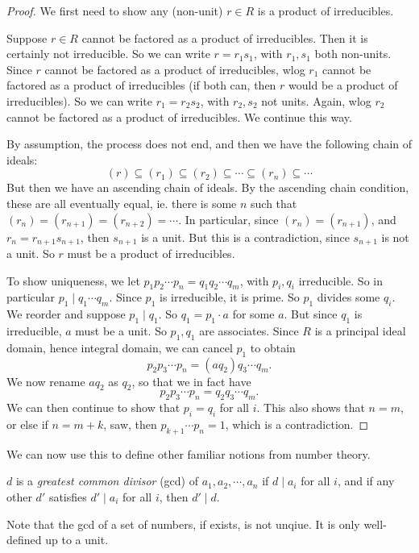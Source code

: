 \documentclass[a4paper]{article}
\begin{document}
\begin{proof}
  We first need to show any (non-unit) $r \in R$ is a product of irreducibles.

  Suppose $r \in R$ cannot be factored as a product of irreducibles. Then it is certainly not irreducible. So we can write $r = r_1 s_1$, with $r_1, s_1$ both non-units. Since $r$ cannot be factored as a product of irreducibles, wlog $r_1$ cannot be factored as a product of irreducibles (if both can, then $r$ would be a product of irreducibles). So we can write $r_1 = r_2 s_2$, with $r_2, s_2$ not units. Again, wlog $r_2$ cannot be factored as a product of irreducibles. We continue this way.

  By assumption, the process does not end, and then we have the following chain of ideals:
  \[
    (r) \subseteq (r_1) \subseteq (r_2) \subseteq \cdots \subseteq (r_n) \subseteq \cdots
  \]
  But then we have an ascending chain of ideals. By the ascending chain condition, these are all eventually equal, ie. there is some $n$ such that $(r_n) = (r_{n + 1}) = (r_{n + 2}) =\cdots$. In particular, since $(r_n) = (r_{n + 1})$, and $r_n = r_{n + 1} s_{n + 1}$, then $s_{n + 1}$ is a unit. But this is a contradiction, since $s_{n + 1}$ is not a unit. So $r$ must be a product of irreducibles.

  To show uniqueness, we let $p_1p_2 \cdots p_n= q_1 q_2 \cdots q_m$, with $p_i, q_i$ irreducible. So in particular $p_1 \mid q_1 \cdots q_m$. Since $p_1$ is irreducible, it is prime. So $p_1$ divides some $q_i$. We reorder and suppose $p_1 \mid q_1$. So $q_1 = p_1 \cdot a$ for some $a$. But since $q_1$ is irreducible, $a$ must be a unit. So $p_1, q_1$ are associates. Since $R$ is a principal ideal domain, hence integral domain, we can cancel $p_1$ to obtain
  \[
    p_2p_3 \cdots p_n = (a q_2) q_3 \cdots q_m.
  \]
  We now rename $aq_2$ as $q_2$, so that we in fact have
  \[
    p_2p_3 \cdots p_n = q_2 q_3 \cdots q_m.
  \]
  We can then continue to show that $p_i = q_i$ for all $i$. This also shows that $n = m$, or else if $n = m + k$, saw, then $p_{k + 1} \cdots p_n = 1$, which is a contradiction.
\end{proof}

We can now use this to define other familiar notions from number theory.
\begin{defi}
  $d$ is a \emph{greatest common divisor} (gcd) of $a_1,a_2, \cdots, a_n$ if $d \mid a_i$ for all $i$, and if any other $d'$ satisfies $d' \mid a_i$ for all $i$, then $d' \mid d$.
\end{defi}
Note that the gcd of a set of numbers, if exists, is not unqiue. It is only well-defined up to a unit.
\end{document}
